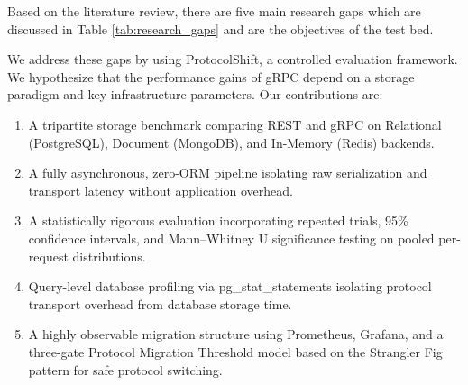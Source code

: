 \documentclass[conference]{IEEEtran}
\begin{document}
Based on the literature review, there are five main research gaps which are discussed in Table \ref{tab:research_gaps} and are the objectives of the test bed.

\vspace{-2mm}
\begin{table}[htbp]
\renewcommand{\arraystretch}{1.2}
\caption{Identified Research Gaps}
\label{tab:research_gaps}
\centering
{}
\end{table}

We address these gaps by using ProtocolShift, a controlled evaluation framework. We hypothesize that the performance gains of gRPC depend on a storage paradigm and key infrastructure parameters. Our contributions are:

\begin{enumerate}
    \item A tripartite storage benchmark comparing REST and gRPC on Relational (PostgreSQL), Document (MongoDB), and In-Memory (Redis) backends.
    \item A fully asynchronous, zero-ORM pipeline isolating raw serialization and transport latency without application overhead.
    \item A statistically rigorous evaluation incorporating repeated trials, 95\% confidence intervals, and Mann--Whitney U significance testing on pooled per-request distributions.
    \item Query-level database profiling via pg\_stat\_statements isolating protocol transport overhead from database storage time.
    \item A highly observable migration structure using Prometheus, Grafana, and a three-gate Protocol Migration Threshold model based on the Strangler Fig pattern for safe protocol switching.
\end{enumerate}
\end{document}
